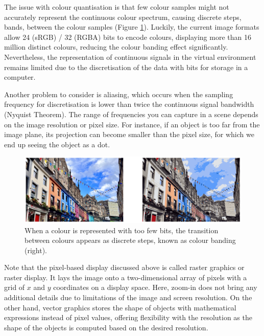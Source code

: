 

The issue with colour quantisation is that few colour samples might not accurately represent the continuous colour spectrum, causing discrete steps, bands, between the colour samples (Figure \ref{fig:colour-band}). Luckily, the current image formats allow 24 (\gls{sRGB}) / 32 (\gls{RGBA}) bits to encode colours, displaying more than 16 million distinct colours, reducing the colour banding effect significantly. Nevertheless, the representation of continuous signals in the virtual environment remains limited due to the discretisation of the data with bits for storage in a computer.

Another problem to consider is aliasing, which occurs when the sampling frequency for discretisation is lower than twice the continuous signal bandwidth (Nyquist Theorem). The range of frequencies you can capture in a scene depends on the image resolution or pixel size. For instance, if an object is too far from the image plane, its projection can become smaller than the pixel size, for which we end up seeing the object as a dot.



\begin{figure}
  \centering
    \includegraphics[width=\linewidth]{Images/colour_quantization.png}

    \caption{When a colour is represented with too few bits, the transition between colours appears as discrete steps, known as colour banding (right).}\label{fig:colour-band}
\end{figure} 


Note that the pixel-based display discussed above is called raster graphics or raster display. It lays the image onto a two-dimensional array of pixels with a grid of $x$ and $y$ coordinates on a display space. Here, zoom-in does not bring any additional details due to limitations of the image and screen resolution. On the other hand, vector graphics stores the shape of objects with mathematical expressions instead of pixel values, offering flexibility with the resolution as the shape of the objects is computed based on the desired resolution.

